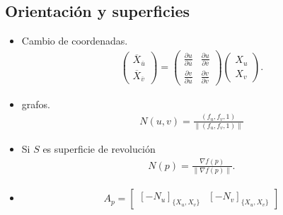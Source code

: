 \documentclass[10pt]{article}
\begin{document}
\scriptsize %

\begin{multicols}{3} %


\section*{Orientación y superficies}
\begin{itemize}
  \item Cambio de coordenadas. 
    \begin{align*}
      \begin{pmatrix}
        \overline{X}_{\overline{u}} \\
        \overline{X}_{\overline{v}}
      \end{pmatrix}
      =\begin{pmatrix}
        \frac{\partial u}{\partial \overline{u}} & \frac{\partial u}{\partial \overline{v}} \\
       \frac{\partial v}{\partial \overline{u}}& \frac{\partial v}{\partial \overline{v}}
      \end{pmatrix}\begin{pmatrix}
        X_{u} \\
        X_{v}
      \end{pmatrix}.
    \end{align*}
    \item grafos. 
      \begin{align*}
        N(u,v)=\frac{(f_{u},f_{v},1)}{\|(f_{u},f_{v},1)\|}
      \end{align*}
    \item Si $S$ es superficie de revolución
      \begin{align*}
        N(p)=\frac{\nabla f(p)}{\|\nabla f(p)\|}.
      \end{align*}
    \item 
      \begin{align*}
        A_{p}=\begin{bmatrix}
          \left[ -N_{u}\right]_{\{X_{u},X_{v}\}} & \left[ -N_{v}\right]_{\{X_{u},X_{v}\}}
        \end{bmatrix}
      \end{align*}
\end{itemize}


\end{multicols}
\end{document}
